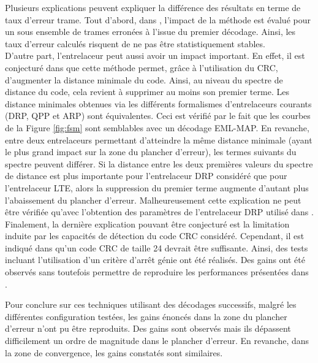 Plusieurs explications peuvent expliquer la différence des résultats en terme de taux d'erreur trame. Tout 
d'abord,  dans \cite{cim}, l'impact de la méthode est évalué pour un sous ensemble de trames erronées à l'issue du premier 
décodage. Ainsi, les taux d'erreur calculés risquent de ne pas être statistiquement stables. \\
D'autre part, l'entrelaceur peut aussi avoir un impact important.
En effet, il est conjecturé dans \cite{fsm} que cette méthode permet, grâce à l'utilisation du CRC, d'augmenter la distance
minimale du code. Ainsi, au niveau du spectre de distance du code, cela revient à supprimer au moins son premier terme.
Les distance minimales obtenues via les différents formalismes d'entrelaceurs courants (DRP, QPP et ARP) sont équivalentes. 
Ceci est vérifié par le fait que les courbes de la Figure \ref{fig:fsm} sont semblables avec un décodage 
EML-MAP. En revanche, entre deux entrelaceurs permettant d'atteindre la même distance minimale (ayant le plus grand impact
sur la zone du plancher d'erreur), les termes suivants du spectre peuvent différer. Si la distance entre les deux 
premières valeurs du spectre de distance est plus importante pour l'entrelaceur DRP considéré que pour l'entrelaceur LTE, alors la 
suppression du premier terme augmente d'autant plus l'abaissement du plancher d'erreur. Malheureusement cette explication ne 
peut être vérifiée qu'avec l'obtention des paramètres de l'entrelaceur DRP utilisé dans \cite{cim}.\\
Finalement, la dernière explication pouvant être conjecturé est la limitation induite par les capacités de détection du
code CRC considéré. Cependant, il est indiqué dans \cite{fsm} qu'un code CRC de taille 24 devrait être suffisante. Ainsi, 
des tests incluant l'utilisation d'un critère d'arrêt génie ont été réalisés. Des gains ont été observés sans toutefois 
permettre de reproduire les performances présentées dans \cite{cim}.

Pour conclure sur ces techniques utilisant des décodages successifs, malgré les différentes configuration testées, les 
gains énoncés dans la zone du plancher d'erreur n'ont pu être reproduits. Des gains sont observés mais ils 
dépassent difficilement un ordre de magnitude dans le plancher d'erreur. En revanche, dans la zone de convergence, les gains 
constatés sont similaires. 


